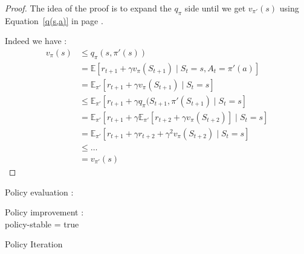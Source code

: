 \documentclass[14pt,a4paper]{article}
\theoremstyle{definition}
\begin{document}
\begin{proof}
The idea of the proof is to expand the $q_{\pi}$ side until we get $v_{\pi'}(s)$ using Equation~\ref{q(s,a)} in page \pageref{q(s,a)}.

Indeed we have : 
\begin{equation}
\begin{split}
v_{\pi}(s) &\leq q_{\pi}(s,\pi'(s))
\\&=\mathbb{E}[r_{t+1}+\gamma v_{\pi}(S_{t+1})\mid S_{t}=s, A_{t}=\pi'(a)]
\\&=\mathbb{E}_{\pi'}[r_{t+1}+\gamma v_{\pi}(S_{t+1})\mid S_{t}=s]
\\& \leq \mathbb{E}_{\pi'}[r_{t+1}+\gamma q_{\pi}(S_{t+1},\pi'(S_{t+1}) \mid S_{t}=s]
\\& = \mathbb{E}_{\pi'}[r_{t+1}+\gamma \mathbb{E}_{\pi'}[r_{t+2}+\gamma v_{\pi}(S_{t+2})]\mid S_{t}=s]
\\& = \mathbb{E}_{\pi'}[r_{t+1}+\gamma r_{t+2}+\gamma^2 v_{\pi}(S_{t+2})\mid S_{t}=s]
\\& \leq \ldots
\\&= v_{\pi'}(s)
\end{split}
\end{equation}
\end{proof}


\begin{algorithm}
    
	
	Policy evaluation :\\
     
     Policy improvement : \\
     policy-stable = true \\
     
	\caption{Policy Iteration}
	\label{algo3}
\end{algorithm}
\end{document}
